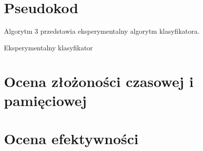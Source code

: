 

\section{Pseudokod}
Algorytm 3 przedstawia eksperymentalny algorytm klasyfikatora.


\begin{algorithm}
	\SetAlgoVlined
	\BlankLine
	\BlankLine
	\caption{Eksperymentalny klasyfikator}
\end{algorithm}

\section{Ocena złożoności czasowej i pamięciowej}

\section{Ocena efektywności}
